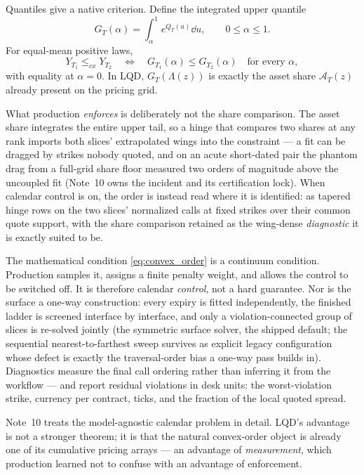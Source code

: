 \documentclass[11pt]{article}
\begin{document}
Quantiles give a native criterion.  Define the integrated upper quantile
\begin{equation}
G_T(\alpha)=\int_\alpha^1e^{Q_T(u)}\dd u,
\qquad 0\le\alpha\le1.
\label{eq:upper_quantile}
\end{equation}
For equal-mean positive laws,
\begin{equation}
Y_{T_1}\le_{cx}Y_{T_2}
\quad\Longleftrightarrow\quad
G_{T_1}(\alpha)\le G_{T_2}(\alpha)
\quad\text{for every }\alpha,
\label{eq:convex_order}
\end{equation}
with equality at $\alpha=0$.  In LQD, $G_T(\Lambda(z))$ is exactly the asset
share $\mathcal A_T(z)$ already present on the pricing grid.

What production \emph{enforces} is deliberately not the share comparison.
The asset share integrates the entire upper tail, so a hinge that compares
two shares at any rank imports both slices' extrapolated wings into the
constraint --- a fit can be dragged by strikes nobody quoted, and on an
acute short-dated pair the phantom drag from a full-grid share floor
measured two orders of magnitude above the uncoupled fit (Note~10 owns the
incident and its certification lock).  When calendar control is on, the
order is instead read where it is identified: as tapered hinge rows on the
two slices' normalized calls at fixed strikes over their common quote
support, with the share comparison retained as the wing-dense
\emph{diagnostic} it is exactly suited to be.

\begin{caution}
The mathematical condition \eqref{eq:convex_order} is a continuum condition.
Production samples it, assigns a finite penalty weight, and allows the control
to be switched off.  It is therefore calendar \emph{control}, not a hard
guarantee.  Nor is the surface a one-way construction: every expiry is
fitted independently, the finished ladder is screened interface by
interface, and only a violation-connected group of slices is re-solved
jointly (the symmetric surface solver, the shipped default; the sequential
nearest-to-farthest sweep survives as explicit legacy configuration whose
defect is exactly the traversal-order bias a one-way pass builds in).
Diagnostics measure the final call ordering rather than inferring it from
the workflow --- and report residual violations in desk units: the
worst-violation strike, currency per contract, ticks, and the fraction of
the local quoted spread.
\end{caution}

Note~10 treats the model-agnostic calendar problem in detail.  LQD's advantage
is not a stronger theorem; it is that the natural convex-order object is
already one of its cumulative pricing arrays --- an advantage of
\emph{measurement}, which production learned not to confuse with an
advantage of enforcement.
\end{document}
